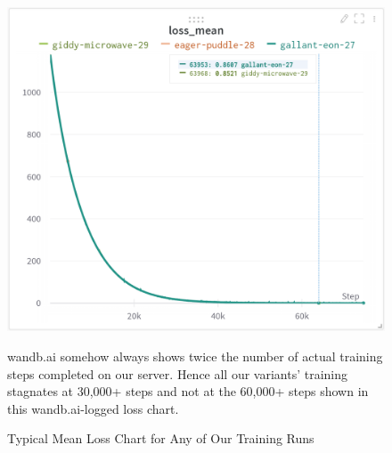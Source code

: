 \begin{figure}[!h]
    \includegraphics[width=0.75\columnwidth]{figures/mean-loss.png}
    \caption{Typical Mean Loss Chart for Any of Our Training Runs}
    \label{fig:mean-loss}
    {\small wandb.ai somehow always shows twice the number of actual training steps completed on our server. Hence all our variants' training stagnates at 30,000+ steps and not at the 60,000+ steps shown in this wandb.ai-logged loss chart.}
\end{figure}

